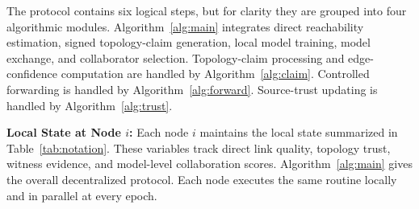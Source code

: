 \documentclass[journal]{IEEEtran}
\theoremstyle{definition}
\theoremstyle{remark}
\begin{document}
The protocol contains six logical steps, but for clarity they are grouped into four algorithmic modules. Algorithm~\ref{alg:main} integrates direct reachability estimation, signed topology-claim generation, local model training, model exchange, and collaborator selection. Topology-claim processing and edge-confidence computation are handled by Algorithm~\ref{alg:claim}. Controlled forwarding is handled by Algorithm~\ref{alg:forward}. Source-trust updating is handled by Algorithm~\ref{alg:trust}.

\textbf{Local State at Node $i$:} Each node $i$ maintains the local state summarized in Table~\ref{tab:notation}. These variables track direct link quality, topology trust, witness evidence, and model-level collaboration scores. Algorithm~\ref{alg:main} gives the overall decentralized protocol. Each node executes the same routine locally and in parallel at every epoch.
\end{document}
